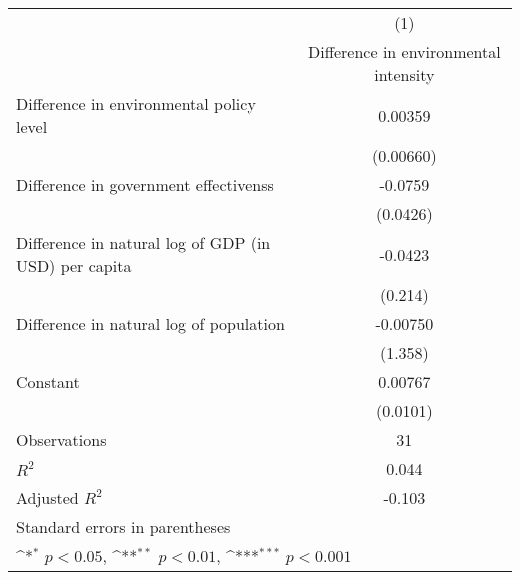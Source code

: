{
\def\sym#1{\ifmmode^{#1}\else\(^{#1}\)\fi}
\begin{tabular}{l*{1}{c}}
\hline\hline
                    &\multicolumn{1}{c}{(1)}\\
                    &\multicolumn{1}{c}{Difference in environmental intensity}\\
\hline
Difference in environmental policy level&     0.00359         \\
                    &   (0.00660)         \\
[1em]
Difference in government effectivenss&     -0.0759         \\
                    &    (0.0426)         \\
[1em]
Difference in natural log of GDP (in USD) per capita&     -0.0423         \\
                    &     (0.214)         \\
[1em]
Difference in natural log of population&    -0.00750         \\
                    &     (1.358)         \\
[1em]
Constant            &     0.00767         \\
                    &    (0.0101)         \\
\hline
Observations        &          31         \\
\(R^{2}\)           &       0.044         \\
Adjusted \(R^{2}\)  &      -0.103         \\
\hline\hline
\multicolumn{2}{l}{\footnotesize Standard errors in parentheses}\\
\multicolumn{2}{l}{\footnotesize \sym{*} \(p<0.05\), \sym{**} \(p<0.01\), \sym{***} \(p<0.001\)}\\
\end{tabular}
}
